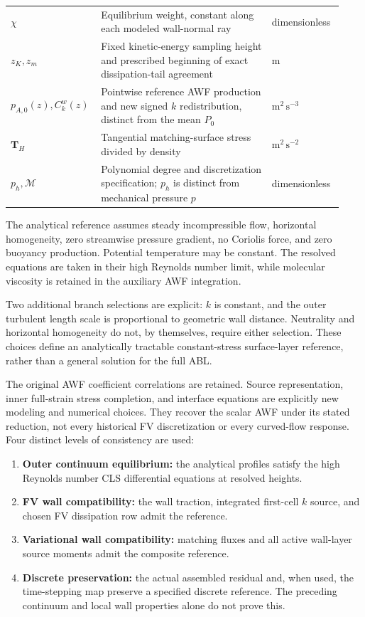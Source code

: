 \documentclass[11pt,a4paper]{article}
\numberwithin{equation}{section}
\begin{document}
\begin{longtable}{@{}>{\raggedright\arraybackslash}p{0.22\linewidth}>{\raggedright\arraybackslash}p{0.50\linewidth}>{\raggedright\arraybackslash}p{0.21\linewidth}@{}}
$\chi$ & Equilibrium weight, constant along each modeled wall-normal ray
& dimensionless\\
$z_K,z_m$ & Fixed kinetic-energy sampling height and prescribed beginning
of exact dissipation-tail agreement & $\mathrm m$\\
$p_{A,0}(z),C_k^w(z)$ & Pointwise reference AWF production and new signed
$k$ redistribution, distinct from the mean $P_0$ & $\mathrm{m^2\,s^{-3}}$\\
$\bm T_H$ & Tangential matching-surface stress divided by density
& $\mathrm{m^2\,s^{-2}}$\\
$p_h,\mathcal M$ & Polynomial degree and discretization specification;
$p_h$ is distinct from mechanical pressure $p$ & dimensionless\\
\bottomrule
\end{longtable}
\endgroup

The analytical reference assumes steady incompressible flow, horizontal
homogeneity, zero streamwise pressure gradient, no Coriolis force, and zero
buoyancy production. Potential temperature may be constant. The resolved
equations are taken in their high Reynolds number limit, while molecular
viscosity is retained in the auxiliary AWF integration.

Two additional branch selections are explicit: $k$ is constant, and
the outer turbulent length scale is proportional to geometric wall distance.
Neutrality and horizontal homogeneity do not, by themselves, require either
selection. These choices define an analytically tractable constant-stress
surface-layer reference, rather than a general solution for the full ABL.

The original AWF coefficient correlations are retained. Source
representation, inner full-strain stress completion, and interface
equations are explicitly new modeling and numerical choices. They
recover the scalar AWF under its stated reduction, not every historical
FV discretization or every curved-flow response. Four distinct levels of consistency are used:
\begin{enumerate}
\item \textbf{Outer continuum equilibrium:} the analytical profiles satisfy
the high Reynolds number CLS differential equations at resolved heights.
\item \textbf{FV wall compatibility:} the wall traction, integrated
first-cell $k$ source, and chosen FV dissipation row admit the reference.
\item \textbf{Variational wall compatibility:} matching fluxes and all
active wall-layer source moments admit the composite reference.
\item \textbf{Discrete preservation:} the actual assembled residual and,
when used, the time-stepping map preserve a specified discrete reference.
The preceding continuum and local wall properties alone do not prove this.
\end{enumerate}
\end{document}

